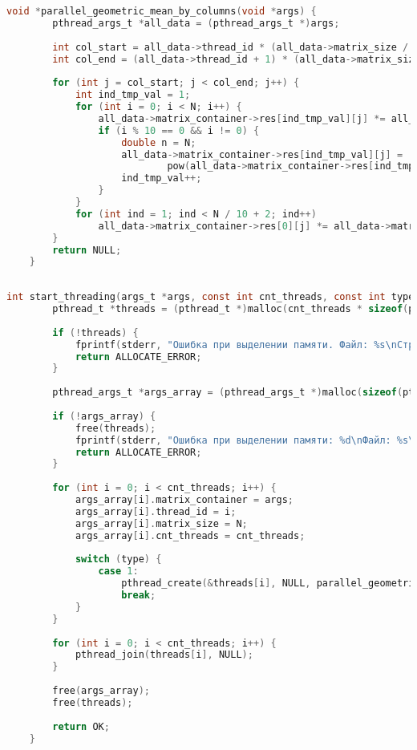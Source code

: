     \begin{lstlisting}[label=some-code,caption=Функция получения среднего геометрического столбцов матрицы параллельно.,language=C]
    void *parallel_geometric_mean_by_columns(void *args) {
        pthread_args_t *all_data = (pthread_args_t *)args;
    
        int col_start = all_data->thread_id * (all_data->matrix_size / all_data->cnt_threads);
        int col_end = (all_data->thread_id + 1) * (all_data->matrix_size / all_data->cnt_threads);
    
        for (int j = col_start; j < col_end; j++) {
            int ind_tmp_val = 1;
            for (int i = 0; i < N; i++) {
                all_data->matrix_container->res[ind_tmp_val][j] *= all_data->matrix_container->m1[i][j];
                if (i % 10 == 0 && i != 0) {
                    double n = N;
                    all_data->matrix_container->res[ind_tmp_val][j] =
                            pow(all_data->matrix_container->res[ind_tmp_val][j], static_cast<double>(1) / n);
                    ind_tmp_val++;
                }
            }
            for (int ind = 1; ind < N / 10 + 2; ind++)
                all_data->matrix_container->res[0][j] *= all_data->matrix_container->res[ind][j];
        }
        return NULL;
    }
    
    \end{lstlisting}
    
    \begin{lstlisting}[label=some-code,caption=Функция создания потоков,language=C]
    int start_threading(args_t *args, const int cnt_threads, const int type) {
        pthread_t *threads = (pthread_t *)malloc(cnt_threads * sizeof(pthread_t));
    
        if (!threads) {
            fprintf(stderr, "Ошибка при выделении памяти. Файл: %s\nСтрока: %d\n", __FILE__, __LINE__);
            return ALLOCATE_ERROR;
        }
    
        pthread_args_t *args_array = (pthread_args_t *)malloc(sizeof(pthread_args_t) * cnt_threads);
    
        if (!args_array) {
            free(threads);
            fprintf(stderr, "Ошибка при выделении памяти: %d\nФайл: %s\n", __LINE__, __FILE__);
            return ALLOCATE_ERROR;
        }
    
        for (int i = 0; i < cnt_threads; i++) {
            args_array[i].matrix_container = args;
            args_array[i].thread_id = i;
            args_array[i].matrix_size = N;
            args_array[i].cnt_threads = cnt_threads;
    
            switch (type) {
                case 1:
                    pthread_create(&threads[i], NULL, parallel_geometric_mean_by_columns, &args_array[i]);
                    break;
            }
        }
    
        for (int i = 0; i < cnt_threads; i++) {
            pthread_join(threads[i], NULL);
        }
    
        free(args_array);
        free(threads);
    
        return OK;
    }
    
    \end{lstlisting}
    
